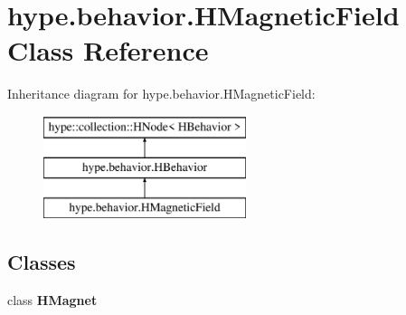 \hypertarget{classhype_1_1behavior_1_1_h_magnetic_field}{\section{hype.\-behavior.\-H\-Magnetic\-Field Class Reference}
\label{classhype_1_1behavior_1_1_h_magnetic_field}
}
Inheritance diagram for hype.\-behavior.\-H\-Magnetic\-Field\-:\begin{figure}[H]
\begin{center}
\leavevmode
\includegraphics[height=3.000000cm]{classhype_1_1behavior_1_1_h_magnetic_field}
\end{center}
\end{figure}
\subsection*{Classes}
\begin{DoxyCompactItemize}
\item 
class {\bfseries H\-Magnet}
\end{DoxyCompactItemize}
